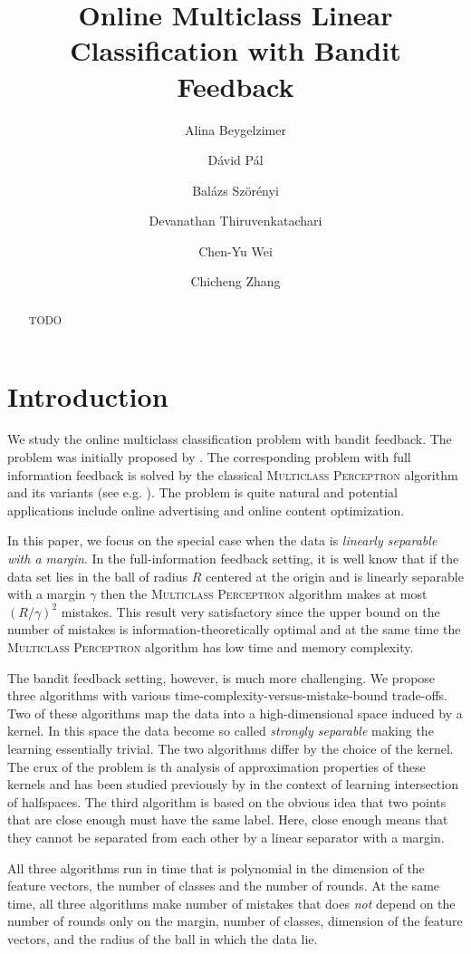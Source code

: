 \documentclass[12pt]{article}
\title{Online Multiclass Linear Classification with Bandit Feedback}
\author{
Alina Beygelzimer \and
D\'avid P\'al \and
Bal\'azs Sz\"or\'enyi \and
Devanathan Thiruvenkatachari \and
Chen-Yu Wei \and
Chicheng Zhang
}
\begin{document}
\maketitle

\begin{abstract}
TODO
\end{abstract}

\section{Introduction}

We study the online multiclass classification problem with bandit feedback. The
problem was initially proposed by \cite{Kakade-Shalev-Shwartz-Tewari-2008}. The
corresponding problem with full information feedback is solved by the classical
\textsc{Multiclass Perceptron} algorithm and its variants (see e.g.
\cite{Crammer-Dekel-Keshet-Shalev-Shwartz-Singer-2006}). The problem is quite
natural and potential applications include online advertising and online content
optimization.

In this paper, we focus on the special case when the data is \emph{linearly
separable with a margin}. In the full-information feedback setting, it is well
know that if the data set lies in the ball of radius $R$ centered at the origin
and is linearly separable with a margin $\gamma$ then the \textsc{Multiclass
Perceptron} algorithm makes at most $(R/\gamma)^2$ mistakes. This result very
satisfactory since the upper bound on the number of mistakes is
information-theoretically optimal and at the same time the \textsc{Multiclass
Perceptron} algorithm has low time and memory complexity.

The bandit feedback setting, however, is much more challenging. We propose three
algorithms with various time-complexity-versus-mistake-bound trade-offs. Two of
these algorithms map the data into a high-dimensional space induced by a kernel.
In this space the data become so called \emph{strongly separable} making the
learning essentially trivial. The two algorithms differ by the choice of the
kernel. The crux of the problem is th analysis of approximation properties of
these kernels and has been studied previously by \cite{???} in the context of
learning intersection of halfspaces. The third algorithm is based on the obvious
idea that two points that are close enough must have the same label. Here, close
enough means that they cannot be separated from each other by a linear separator
with a margin.

All three algorithms run in time that is polynomial in the dimension of the
feature vectors, the number of classes and the number of rounds. At the same
time, all three algorithms make number of mistakes that does \emph{not} depend
on the number of rounds only on the margin, number of classes, dimension of the
feature vectors, and the radius of the ball in which the data lie.
\end{document}
